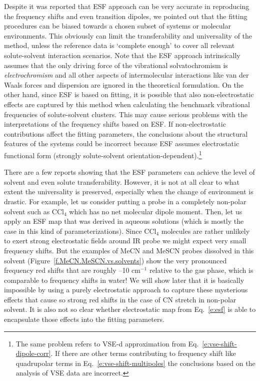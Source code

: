\documentclass[a4paper,titlepage,twoside,fleqn,12pt]{book}
\begin{document}
\begin{refsection}
Despite it was reported that ESF approach can be very accurate in reproducing the frequency shifts and even
transition dipoles, we pointed out that the fitting procedures
can be biased towards a chosen subset of systems or molecular environments. This obviously can limit
the transferability and universality of the method, unless the reference data is `complete enough'
to cover all relevant solute\hyp{}solvent interaction scenarios. Note that the ESF approach intrinsically
assumes that the only driving force of the vibrational solvatochromism is \emph{electrochromism}
and all other aspects of intermolecular interactions like van der Waals forces and dispersion are
ignored in the theoretical formulation. On the other hand, since ESF is based on fitting, it is 
possible that also non\hyp{}electrostatic effects are captured by this method when calculating the benchmark 
vibrational frequencies of solute\hyp{}solvent clusters. This may cause serious problems with the interpretations
of the frequency shifts based on ESF. If non\hyp{}electrostatic contributions affect the fitting
parameters, the conclusions about the structural features of the systems could be incorrect 
because ESF assumes electrostatic functional form (strongly solute\hyp{}solvent orientation\hyp{}dependent).\footnote{
The same problem refers to VSE-d approximation from Eq.~\eqref{e:vse-shift-dipole-corr}.
If there are other terms contributing to frequency shift like quadrupolar terms 
in Eq.~\eqref{e:vse-shift-multipoles} the conclusions based
on the analysis of VSE data are incorrect.}

There are a few reports showing that the ESF parameters can achieve the level of solvent
and even solute transferability. \citep{Kwac.Lee.Cho.JCP.2004,
DeCamp.DeFlores.McCracken.Tokmakoff.Kwac.Cho.JPCB.2005,Jansen.Knoester.JCP.2006,
Choi.Raleigh.Cho.JCPL.2011} However, it is not at all clear to what extent the universality is
preserved, especially when the change of environment is drastic. For example, let us consider putting a probe in
a completely non\hyp{}polar solvent such as CCl$_4$ which has no net molecular dipole moment. 
Then, let us apply an ESF map that was derived in aqueous solutions (which is mostly the case in this kind
of parameterizations). Since CCl$_4$ molecules are rather unlikely to exert strong electrostatic fields 
around IR probe we might expect very small frequency shifts. But the examples of MeCN and MeSCN probes
dissolved in this solvent (Figure~\ref{f.MeCN.MeSCN.vs.solvents}) 
show the very pronounced frequency red shifts that are roughly --10 cm$^{-1}$
relative to the gas phase, which is comparable to frequency shifts in water! 
We will show later that it is basically impossible by using a purely electrostatic approach
to capture these mysterious effects that cause so strong red shifts in the case of CN stretch in non\hyp{}polar
solvent. It is also not so clear whether electrostatic map from Eq.~\eqref{e:esf} is able to 
encapsulate those effects into the fitting parameters.


\end{refsection}
\end{document}
